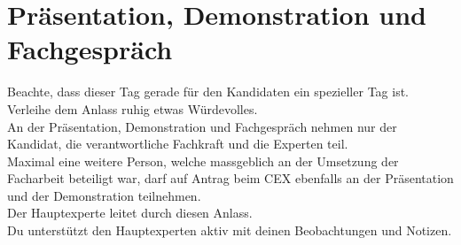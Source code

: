 \section{Präsentation, Demonstration und Fachgespräch}
Beachte, dass dieser Tag gerade für den Kandidaten ein spezieller Tag ist.\\
Verleihe dem Anlass ruhig etwas Würdevolles.\\
An der Präsentation, Demonstration und Fachgespräch nehmen nur der Kandidat, die verantwortliche Fachkraft und die Experten teil.\\
Maximal eine weitere Person, welche massgeblich an der Umsetzung der Facharbeit beteiligt war, darf auf Antrag beim CEX ebenfalls an der Präsentation und der Demonstration teilnehmen.\\
Der Hauptexperte leitet durch diesen Anlass.\\
Du unterstützt den Hauptexperten aktiv mit deinen Beobachtungen und Notizen.


